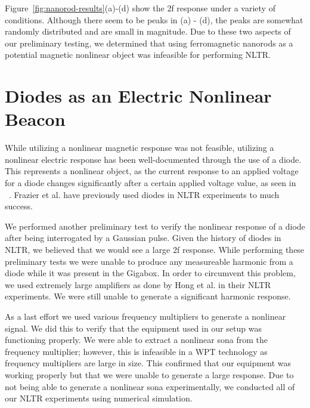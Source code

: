 Figure~\ref{fig:nanorod-results}(a)-(d) show the 2f response under a variety of conditions. Although there seem to be peaks in (a) - (d), the peaks are somewhat randomly distributed and are small in magnitude. Due to these two aspects of our preliminary testing, we determined that using ferromagnetic nanorods as a potential magnetic nonlinear object was infeasible for performing NLTR. 

\chapter{Diodes as an Electric Nonlinear Beacon}

While utilizing a nonlinear magnetic response was not feasible, utilizing a nonlinear electric response has been well-documented through the use of a diode. This represents a nonlinear object, as the current response to an applied voltage for a diode changes significantly after a certain applied voltage value, as seen in ~. Frazier et al. have previously used diodes in NLTR experiments to much success.

We performed another preliminary test to verify the nonlinear response of a diode after being interrogated by a Gaussian pulse. Given the history of diodes in NLTR, we believed that we would see a large 2f response. While performing these preliminary tests we were unable to produce any measureable harmonic from a diode while it was present in the Gigabox. In order to circumvent this problem, we used extremely large amplifiers as done by Hong et al. in their NLTR experiments. We were still unable to generate a significant harmonic response.

As a last effort we used various frequency multipliers to generate a nonlinear signal. We did this to verify that the equipment used in our setup was functioning properly. We were able to extract a nonlinear sona from the frequency multiplier; however, this is infeasible in a WPT technology as frequency multipliers are large in size. This confirmed that our equipment was working properly but that we were unable to generate a large response. Due to not being able to generate a nonlinear sona experimentally, we conducted all of our NLTR experiments using numerical simulation.

